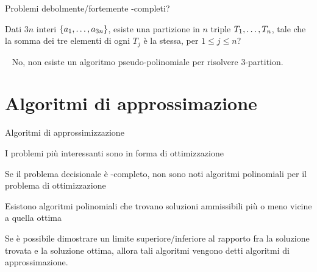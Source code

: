 \begin{frame}{Problemi debolmente/fortemente \NP-completi?}

\vspace{-9pt}
\begin{myboxtitle}
Dati $3n$ interi $\{a_1, \ldots, a_{3n}\}$, esiste una partizione in $n$
triple $T_1, \ldots, T_n$, tale che la somma dei tre elementi di ogni $T_j$ è
la stessa, per $1 \le j \le n$?
\end{myboxtitle}

\begin{myboxtitle}
\begin{overprint}
~
No, non esiste un algoritmo pseudo-polinomiale per risolvere 3-partition.
\end{overprint}
\end{myboxtitle}

\end{frame}

\section{Algoritmi di approssimazione}

\begin{frame}{Algoritmi di approssimizzazione}

\vspace{-9pt}
\begin{myboxtitle}[Premessa]
\BIL
\item I problemi più interessanti sono in forma di ottimizzazione
\item Se il problema decisionale è \NP-completo, non sono noti 
algoritmi polinomiali per il problema di ottimizzazione
\item Esistono algoritmi polinomiali che trovano soluzioni ammissibili
più o meno vicine a quella ottima
\EIL
\end{myboxtitle}

\begin{myboxtitle}
Se è possibile dimostrare un limite superiore/inferiore al rapporto fra la soluzione trovata e la soluzione ottima, allora tali algoritmi
vengono detti \alert{algoritmi di approssimazione}.
\end{myboxtitle}

\end{frame}

